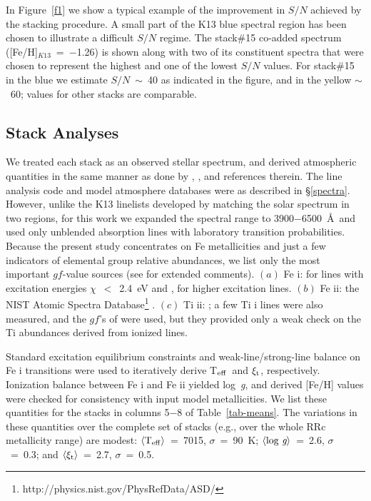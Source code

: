 \documentclass[preprint]{aastex6}
\newcommand\species[2]{#1 {\sc #2}}
\def\eg{\mbox{e.g.}}
\def\teff{\mbox{T$_{\rm eff}$}}
\def\logg{\mbox{log~{\it g}}}
\def\vmicro{\mbox{$\xi_{\rm t}$}}
\begin{document}
In Figure~\ref{f1} we show a typical example of the improvement in 
$S/N$ achieved by the stacking procedure.  
A small part of the K13 blue spectral region has been chosen to illustrate
a difficult $S/N$ regime.
The stack\#15 co-added spectrum ([Fe/H]$_{K13}$~=~$-$1.26) is shown
along with two of its constituent spectra that were chosen to represent the
highest and one of the lowest $S/N$ values.
For stack\#15 in the blue we estimate $S/N$~$\sim$~40 as indicated in 
the figure, and in the yellow $\sim$~60; values for other stacks 
are comparable.


\subsection{Stack Analyses}\label{stackmods}

We treated each stack as an observed stellar spectrum, and derived
atmospheric quantities in the same manner as done by \cite{chadid17}, 
\cite{sneden17}, and references therein.
The line analysis code and model atmosphere databases were as described
in \S\ref{spectra}.
However, unlike the K13 linelists developed by matching the solar
spectrum in two regions, for this work we expanded the spectral range to 
3900$-$6500~\AA\ and used only unblended absorption lines with laboratory 
transition probabilities.  
Because the present study concentrates on Fe metallicities and just a few 
indicators of elemental group relative abundances, we list only the most 
important $gf$-value sources (see \citealt{sneden16} for extended comments).  
$(a)$ \species{Fe}{i}: \cite{obrian91} for lines with excitation energies
$\chi$~$<$~2.4~eV and \cite{denhartog14}, \cite{ruffoni14} for higher
excitation lines.
$(b)$ \species{Fe}{ii}: the NIST Atomic Spectra Database\footnote{
http://physics.nist.gov/PhysRefData/ASD/} \citep{NIST15}.
$(c)$ \species{Ti}{ii}: \cite{wood13}; a few \species{Ti}{i} lines were also
measured, and the $gf$'s of \cite{lawler13} were used, but they provided
only a weak check on the Ti abundances derived from ionized lines.

Standard excitation equilibrium constraints and weak-line/strong-line
balance on \species{Fe}{i} transitions were used to iteratively derive 
\teff\ and \vmicro, respectively.
Ionization balance between \species{Fe}{i} and \species{Fe}{ii} yielded
\logg, and derived [Fe/H] values were checked for consistency with input
model metallicities.
We list these quantities for the stacks in columns 5$-$8
of Table~\ref{tab-means}.
The variations in these quantities over the complete set of stacks
(\eg, over the whole RRc metallicity range) are modest:
$\langle\teff\rangle$~=~7015, $\sigma$~=~90~K;
$\langle\logg\rangle$~=~2.6, $\sigma$~=~0.3; and
$\langle\vmicro\rangle$~=~2.7, $\sigma$~=~0.5.
\end{document}
